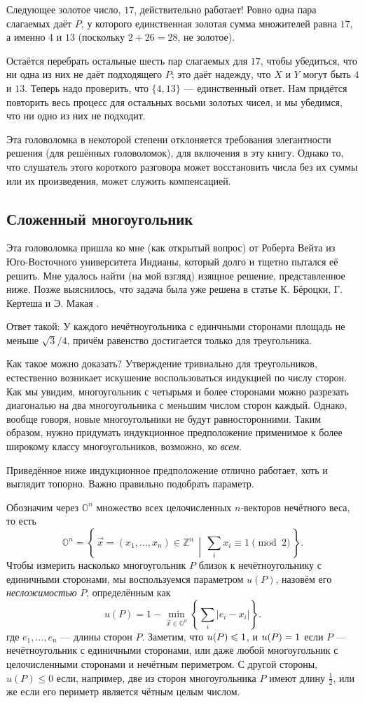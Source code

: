 Следующее золотое число, $17$, действительно работает!
Ровно одна пара слагаемых даёт $P$, у которого единственная золотая сумма множителей равна $17$, а именно $4$ и $13$ (поскольку $2 + 26 = 28$, не золотое).

Остаётся перебрать остальные шесть пар слагаемых для $17$, чтобы убедиться, что ни одна из них не даёт подходящего $P$;
это даёт надежду, что $X$ и $Y$ могут быть $4$ и $13$.
Теперь надо проверить, что $\{4, 13\}$ --- единственный ответ.
Нам придётся повторить весь процесс для остальных восьми золотых чисел, 
и мы убедимся, что ни одно из них не подходит.

Эта головоломка в некоторой степени отклоняется требования элегантности решения (для решённых головоломок),  для включения в эту книгу.
Однако то, что слушатель этого короткого разговора может восстановить числа без их суммы или их произведения, может служить компенсацией.

\subsection*{Сложенный многоугольник}

Эта головоломка пришла ко мне (как открытый вопрос) от Роберта Вейта из Юго-Восточного университета Индианы, который долго и тщетно пытался её решить.
Мне удалось найти (на мой взгляд) изящное решение, представленное ниже.
Позже выяснилось, что задача была уже решена в статье К. Бёроцки, Г. Кертеша и Э. Макая \cite{9}.

Ответ такой: У каждого нечётноугольника с единчными сторонами площадь не меньше $\sqrt{3}/4$, причём равенство достигается только для треугольника.

Как такое можно доказать?
Утверждение тривиально для треугольников,
естественно возникает искушение воспользоваться индукцией по числу сторон.
Как мы увидим,  многоугольник с четырьмя и более сторонами можно разрезать диагональю на два многоугольника с меньшим числом сторон каждый.
Однако, вообще говоря, новые многоугольники не будут равносторонними.
Таким образом, нужно придумать индукционное предположение применимое к более широкому классу многоугольников, возможно, ко \emph{всем}.

Приведённое ниже индукционное предположение отлично работает, хоть и выглядит топорно.
Важно правильно подобрать параметр.

Обозначим через $\mathbb{O}^n$ множество всех целочисленных $n$-векторов нечётного веса, то есть 
\[\mathbb{O}^n=\left\{\,\vec x=(x_1,\dots,x_n)\in \mathbb{Z}^n\,\middle|\, \sum_ix_i\equiv 1\pmod 2\,\right\}.\]
Чтобы измерить насколько многоугольник $P$ близок к нечётноугольнику с единичными сторонами, мы воспользуемся параметром $u(P)$, назовём его \emph{несложимостью} $P$, определённым как
\[u(P)=1-\min_{\vec x\in \mathbb{O}^n} \left\{\sum_i |e_i-x_i|\right\}.\]
где  $e_1,\dots,e_n$ --- длины сторон $P$.
Заметим, что $u(P)\z\leqslant1$, и $u(P)\z=1$ если $P$ --- нечётноугольник с единичными сторонами, или даже любой многоугольник с целочисленными сторонами и нечётным периметром.
С другой стороны, $u(P)\leqslant 0$ если, например, две из сторон многоугольника $P$ имеют длину $\tfrac12$, или же если его периметр является чётным целым числом.

